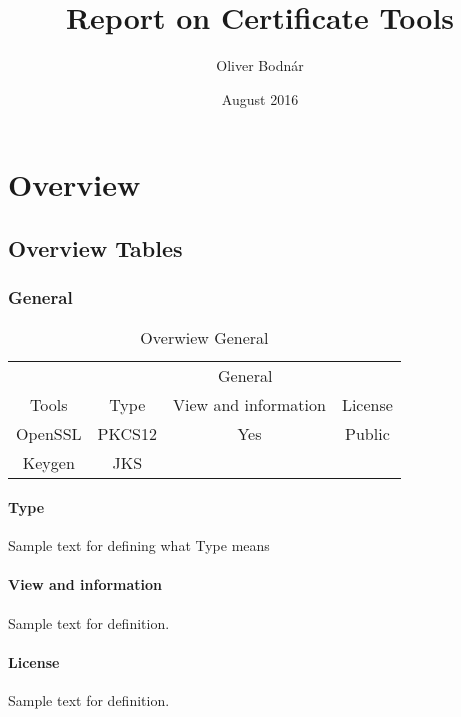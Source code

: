 \documentclass[10pt, a4paper]{report}
\title{Report on Certificate Tools}
\author{Oliver Bodnár}
\date{August 2016}
\begin{document}
\maketitle

\tableofcontents

\newpage

\part{Overview}

\chapter{Overview Tables}

\section{General}
\begin{table}[h!]
\centering
\caption{Overwiew General}
\label{my-label}
\begin{adjustbox}{max width=\textwidth}
\begin{tabular}{|c|c|c|c|}
\hline
                        & \multicolumn{3}{c|}{General}                   \\ \cline{2-4} 
\multirow{-2}{*}{Tools} & Type   & View and information        & License \\ \hline
OpenSSL                 & PKCS12 & \cellcolor[HTML]{34FF34}Yes & Public  \\ \hline
Keygen                  & JKS    &                             &         \\ \hline
\end{tabular}
\end{adjustbox}
\end{table}

\subsection{Type}
Sample text for defining what Type means

\subsection{View and information}
Sample text for definition.

\subsection{License}
Sample text for definition.
\end{document}
